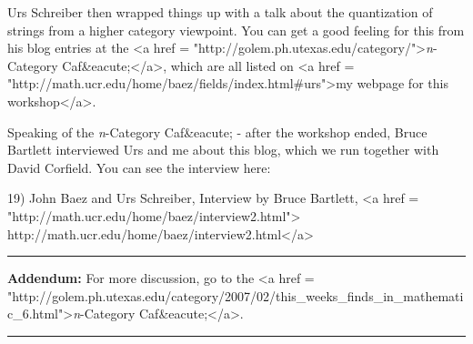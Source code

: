 Urs Schreiber then wrapped things up with a talk about the
quantization of strings from a higher category viewpoint.  You can get
a good feeling for this from his blog entries at the
<a href = "http://golem.ph.utexas.edu/category/">\emph{n}-Category Caf&eacute;</a>, which are all listed on <a href = "http://math.ucr.edu/home/baez/fields/index.html#urs">my webpage
for this workshop</a>.

Speaking of the \emph{n}-Category Caf&eacute; - after the workshop
ended, Bruce Bartlett interviewed Urs and me about this blog, which
we run together with David Corfield.  You can see the interview here:

19) John Baez and Urs Schreiber, Interview by Bruce Bartlett, 
<a href = "http://math.ucr.edu/home/baez/interview2.html">
http://math.ucr.edu/home/baez/interview2.html</a>  


\par\noindent\rule{\textwidth}{0.4pt}
\textbf{Addendum:} For more discussion, go to the <a href = "http://golem.ph.utexas.edu/category/2007/02/this_weeks_finds_in_mathematic_6.html">\emph{n}-Category
Caf&eacute;</a>.



\par\noindent\rule{\textwidth}{0.4pt}


